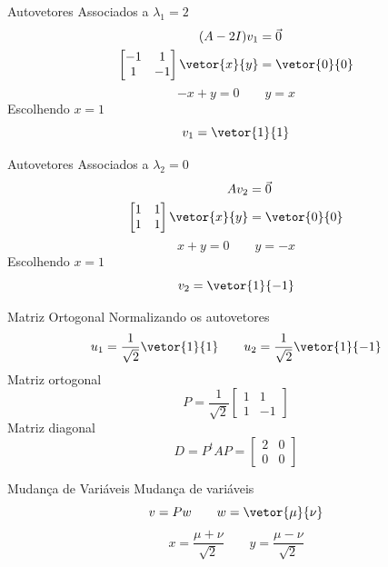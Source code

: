 \begin{resolution}{Autovetores Associados a $\lambda_1=2$}
  \begin{align*}
    (A-2I)v_1 & = \vec{0} \\
    \begin{bmatrix}
      -1&1\\
      1&-1
    \end{bmatrix}
    \vetor{x}{y}
    & = \vetor{0}{0}
  \end{align*}
  \[
    -x+y=0
    \qquad
    y=x
  \]
  Escolhendo \(x=1\)
  \[
    v_1=\vetor{1}{1}
  \]
\end{resolution}

\begin{resolution}{Autovetores Associados a $\lambda_2=0$}
  \begin{align*}
    Av_2 & = \vec{0} \\
    \begin{bmatrix}
      1&1\\
      1&1
    \end{bmatrix}
    \vetor{x}{y}
    & = \vetor{0}{0}
  \end{align*}
  \[
    x+y=0
    \qquad
    y=-x
  \]
  Escolhendo \(x=1\)
  \[
    v_2=\vetor{1}{-1}
  \]
\end{resolution}

\begin{resolution}{Matriz Ortogonal}
  Normalizando os autovetores
  \[
    u_1=\frac{1}{\sqrt{2}}\vetor{1}{1}
    \qquad
    u_2=\frac{1}{\sqrt{2}}\vetor{1}{-1}
  \]
  Matriz ortogonal
  \[
    P=\frac{1}{\sqrt{2}}
    \begin{bmatrix}
      1&1\\
      1&-1
    \end{bmatrix}
  \]
  Matriz diagonal
  \[
    D=P^tAP
    =\begin{bmatrix}
      2&0\\
      0&0
    \end{bmatrix}
  \]
\end{resolution}

\begin{resolution}{Mudança de Variáveis}
  Mudança de variáveis
  \[
    v=Pw
    \qquad
    w=\vetor{\mu}{\nu}
  \]
  \[
    x=\frac{\mu+\nu}{\sqrt{2}}
    \qquad
    y=\frac{\mu-\nu}{\sqrt{2}}
  \]
\end{resolution}

